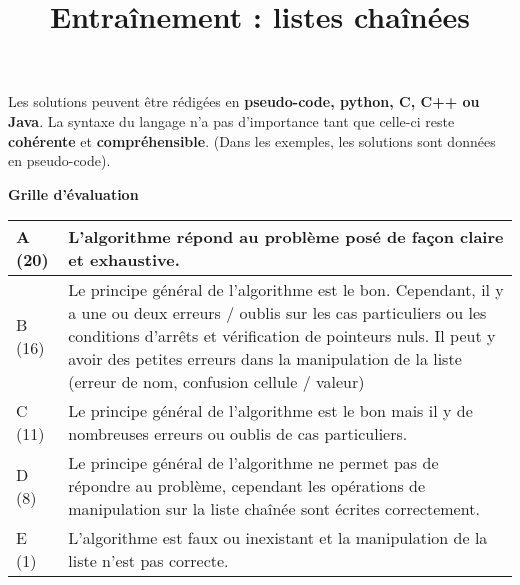 \documentclass{../cours}
\title{Entraînement : listes chaînées}
\begin{document}
\maketitle

Les solutions peuvent être rédigées en \textbf{pseudo-code, python, C, C++ ou Java}. La syntaxe du langage n'a pas d'importance tant que celle-ci reste \textbf{cohérente} et \textbf{compréhensible}. (Dans les exemples, les solutions sont données en pseudo-code).

\textbf{Grille d'évaluation}

\vspace{0.5cm}

\begin{tabular}{|l|p{12cm}|}
\hline
A (20) & \small{L’algorithme répond au problème posé de façon claire et exhaustive.} \\ \hline
B (16) &\small{Le principe général de l'algorithme est le bon. Cependant, il y a une ou deux erreurs / oublis sur les cas particuliers ou les conditions d'arrêts et vérification de pointeurs nuls. Il peut y avoir des petites erreurs dans la manipulation de la liste (erreur de nom, confusion cellule / valeur)} \\ \hline
C (11) & \small{Le principe général de l'algorithme est le bon mais il y de nombreuses erreurs ou oublis de cas particuliers.}\\ \hline
D (8) &\small{Le principe général de l’algorithme ne permet pas de répondre au problème, cependant les opérations de manipulation sur la liste chaînée sont écrites correctement.} \\ \hline
E (1) & \small{L’algorithme est faux ou inexistant et la manipulation de la liste n'est pas correcte.} \\ \hline
\end{tabular}




\end{document}
